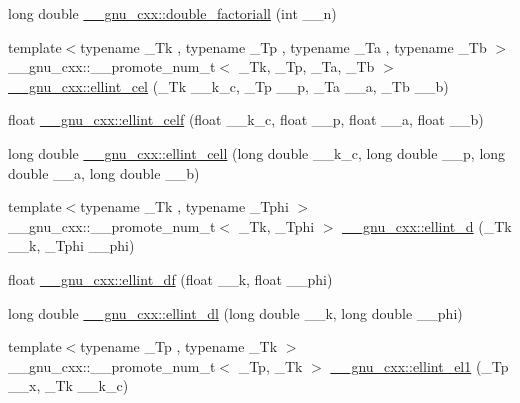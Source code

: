 \begin{DoxyCompactItemize}
\item 
long double \hyperlink{group__gnu__math__spec__func_ga0366730a4a775256217ef1cd9d0c3a04}{\+\_\+\+\_\+gnu\+\_\+cxx\+::double\+\_\+factoriall} (int \+\_\+\+\_\+n)
\item 
{\footnotesize template$<$typename \+\_\+\+Tk , typename \+\_\+\+Tp , typename \+\_\+\+Ta , typename \+\_\+\+Tb $>$ }\\\+\_\+\+\_\+gnu\+\_\+cxx\+::\+\_\+\+\_\+promote\+\_\+num\+\_\+t$<$ \+\_\+\+Tk, \+\_\+\+Tp, \+\_\+\+Ta, \+\_\+\+Tb $>$ \hyperlink{group__gnu__math__spec__func_gac1210d62b8e17df7c68cce463850a98f}{\+\_\+\+\_\+gnu\+\_\+cxx\+::ellint\+\_\+cel} (\+\_\+\+Tk \+\_\+\+\_\+k\+\_\+c, \+\_\+\+Tp \+\_\+\+\_\+p, \+\_\+\+Ta \+\_\+\+\_\+a, \+\_\+\+Tb \+\_\+\+\_\+b)
\item 
float \hyperlink{group__gnu__math__spec__func_ga6d8fbef7853cf37de11278b1ff7127e8}{\+\_\+\+\_\+gnu\+\_\+cxx\+::ellint\+\_\+celf} (float \+\_\+\+\_\+k\+\_\+c, float \+\_\+\+\_\+p, float \+\_\+\+\_\+a, float \+\_\+\+\_\+b)
\item 
long double \hyperlink{group__gnu__math__spec__func_gaa5add699fb2b4b02e63f8725a3a79750}{\+\_\+\+\_\+gnu\+\_\+cxx\+::ellint\+\_\+cell} (long double \+\_\+\+\_\+k\+\_\+c, long double \+\_\+\+\_\+p, long double \+\_\+\+\_\+a, long double \+\_\+\+\_\+b)
\item 
{\footnotesize template$<$typename \+\_\+\+Tk , typename \+\_\+\+Tphi $>$ }\\\+\_\+\+\_\+gnu\+\_\+cxx\+::\+\_\+\+\_\+promote\+\_\+num\+\_\+t$<$ \+\_\+\+Tk, \+\_\+\+Tphi $>$ \hyperlink{group__gnu__math__spec__func_ga6a594ffefbe4f238f98fa2190b03795f}{\+\_\+\+\_\+gnu\+\_\+cxx\+::ellint\+\_\+d} (\+\_\+\+Tk \+\_\+\+\_\+k, \+\_\+\+Tphi \+\_\+\+\_\+phi)
\item 
float \hyperlink{group__gnu__math__spec__func_ga02ed50be21fdd84ad6bed003f94a9e69}{\+\_\+\+\_\+gnu\+\_\+cxx\+::ellint\+\_\+df} (float \+\_\+\+\_\+k, float \+\_\+\+\_\+phi)
\item 
long double \hyperlink{group__gnu__math__spec__func_gaa34bcb8e316f2e8b2b2bf48cd89abd98}{\+\_\+\+\_\+gnu\+\_\+cxx\+::ellint\+\_\+dl} (long double \+\_\+\+\_\+k, long double \+\_\+\+\_\+phi)
\item 
{\footnotesize template$<$typename \+\_\+\+Tp , typename \+\_\+\+Tk $>$ }\\\+\_\+\+\_\+gnu\+\_\+cxx\+::\+\_\+\+\_\+promote\+\_\+num\+\_\+t$<$ \+\_\+\+Tp, \+\_\+\+Tk $>$ \hyperlink{group__gnu__math__spec__func_gaf47c2f4fec36c1be5c5e2887269593f0}{\+\_\+\+\_\+gnu\+\_\+cxx\+::ellint\+\_\+el1} (\+\_\+\+Tp \+\_\+\+\_\+x, \+\_\+\+Tk \+\_\+\+\_\+k\+\_\+c)

\end{DoxyCompactItemize}
